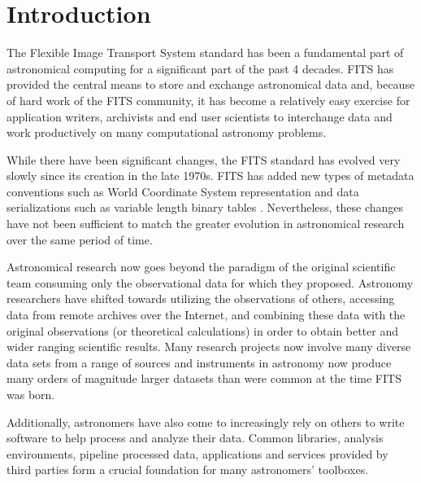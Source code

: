 \documentclass[11pt,twoside]{article}
\begin{document}
\section{Introduction}

The Flexible Image Transport System standard
\citep[FITS;][]{1981A&AS...44..363W,2001A&A...376..359H,2010A&A...524A..42P}
has been a fundamental part of astronomical computing for a
significant part of the past 4 decades. FITS has provided the central
means to store and exchange astronomical data and, because of hard
work of the FITS community, it has become a relatively easy exercise
for application writers, archivists and end user scientists to
interchange data and work productively on many computational astronomy
problems. 



While there have been significant changes, the FITS standard has
evolved very slowly since its creation in the late 1970s. FITS has
added new types of metadata conventions such as World Coordinate
System
\citep[WCS;][]{2002A&A...395.1061G,2002A&A...395.1077C,2006A&A...446..747G}
representation and data serializations such as variable length binary
tables \citep{1995A&AS..113..159C}. Nevertheless, these changes have
not been sufficient to match the greater evolution in astronomical
research over the same period of time.

Astronomical research now goes beyond the paradigm of the original
scientific team consuming only the observational data for which they
proposed. Astronomy researchers have shifted towards utilizing the
observations of others, accessing data from remote archives over the
Internet, and combining these data with the original observations (or
theoretical calculations) in order to obtain better and wider ranging
scientific results. Many research projects now involve many diverse
data sets from a range of sources and instruments in astronomy now
produce many orders of magnitude larger datasets than were common at
the time FITS was born.

Additionally, astronomers have also come to increasingly rely on 
others to write software to help process and analyze their data. Common 
libraries, analysis environments, pipeline processed data, applications 
and services provided by third parties form a crucial foundation for many
astronomers' toolboxes. 
\end{document}
